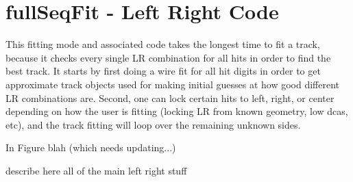       \section{fullSeqFit - Left Right Code}

      This fitting mode and associated code takes the longest time to fit a track, because it checks every single LR combination for all hits in order to find the best track. It starts by first doing a wire fit for all hit digits in order to get approximate track objects used for making initial guesses at how good different LR combinations are. Second, one can lock certain hits to left, right, or center depending on how the user is fitting (locking LR from known geometry, low dcas, etc), and the track fitting will loop over the remaining unknown sides.

      In Figure blah (which needs updating...)


      describe here all of the main left right stuff
